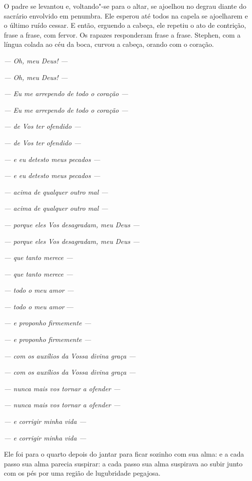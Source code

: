 O padre se levantou e, voltando"-se para o altar, se ajoelhou no degrau
diante do sacrário envolvido em penumbra. Ele esperou até todos na
capela se ajoelharem e o último ruído cessar. E então, erguendo a
cabeça, ele repetiu o ato de contrição, frase a frase, com fervor. Os
rapazes responderam frase a frase. Stephen, com a língua colada ao céu
da boca, curvou a cabeça, orando com o coração.

{\itshape
 --- Oh, meu Deus! --- }

{\itshape
 --- Oh, meu Deus! --- }

{\itshape
 --- Eu me arrependo de todo o coração --- }

{\itshape
 --- Eu me arrependo de todo o coração --- }

{\itshape
 --- de Vos ter ofendido --- }

{\itshape
 --- de Vos ter ofendido --- }

{\itshape
 --- e eu detesto meus pecados --- }

{\itshape
 --- e eu detesto meus pecados --- }

{\itshape
 --- acima de qualquer outro mal --- }

{\itshape
 --- acima de qualquer outro mal --- }

{\itshape
 --- porque eles Vos desagradam, meu Deus --- }

{\itshape
 --- porque eles Vos desagradam, meu Deus --- }

{\itshape
 --- que tanto merece --- }

{\itshape
 --- que tanto merece --- }

{\itshape
 --- todo o meu amor --- }

{\itshape
 --- todo o meu amor} --- 

{\itshape
 --- e proponho firmemente --- }

{\itshape
 --- e proponho firmemente --- }

{\itshape
 --- com os auxílios da Vossa divina graça --- }

{\itshape
 --- com os auxílios da Vossa divina graça --- }

{\itshape
 --- nunca mais vos tornar a ofender --- }

{\itshape
 --- nunca mais vos tornar a ofender --- }

{\itshape
 --- e corrigir minha vida --- }

{\itshape
 --- e corrigir minha vida --- }

\asterisc

Ele foi para o quarto depois do jantar para ficar sozinho com sua alma:
e a cada passo sua alma parecia suspirar: a cada passo sua alma
suspirava ao subir junto com os pés por uma região de lugubridade
pegajosa.

